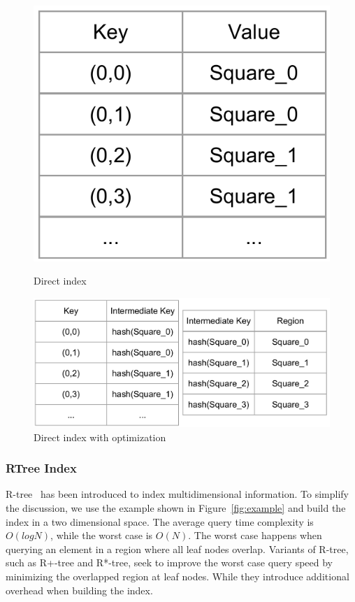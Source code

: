 \documentclass{sig-alternate}
\begin{document}
\begin{figure}
\centering
\begin{minipage}{.3\linewidth}
  \includegraphics[width=\linewidth]{pictures/direct}
  \caption{Direct index}
  \label{fig:direct}
\end{minipage}
\hspace{.05\linewidth}
\begin{minipage}{.6\linewidth}
  \includegraphics[width=\linewidth]{pictures/direct-optimized}
  \caption{Direct index with optimization}
  \label{fig:direct-optimized}
\end{minipage}
\end{figure}


\subsubsection{RTree Index}
R-tree~\cite{guttman1984} has been introduced to index multidimensional information.
To simplify the discussion, we use the example shown in Figure~\ref{fig:example} and build the index in a two dimensional space.
The average query time complexity is $O(logN)$, while the worst case is $O(N)$. 
The worst case happens when querying an element in a region where all leaf nodes overlap.
Variants of R-tree, such as R+-tree and R*-tree, seek to improve the worst case query speed by minimizing the overlapped region at leaf nodes.
While they introduce additional overhead when building the index.
\end{document}
